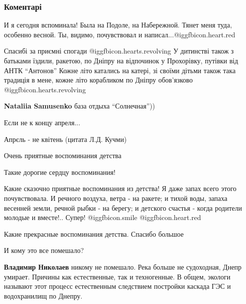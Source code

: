  
 
 
 
 
\subsubsection{Коментарі}
\label{sec:30_03_2021.fb.fb_group.story_kiev_ua.1.dnepr_semja_otdyh.cmt}

\begin{itemize} %
И я сегодня вспоминала! Была на Подоле, на Набережной. Тянет меня туда,
особенно весной. Ты, видимо, почувствовал и написал...@igg{fbicon.heart.red}

Спасибі за приємні спогади @igg{fbicon.hearts.revolving} 
У дитинстві також з батьками їздили, ракетою, по Дніпру на відпочинок у Прохорівку, путівки від АНТК \enquote{Антонов}
Кожне літо катались на катері, зі своїми дітьми також така традиція в мене, кожне літо корабликом по Дніпру обов'язково @igg{fbicon.hearts.revolving} 

\textbf{Nataliia Samusenko} база отдыха \enquote{Солнечная}))

Если не к концу апреля...

Апрєль - не квітень (цитата Л.Д. Кучми)

Очень приятные воспоминания детства

Такие дорогие сердцу воспоминания!


Какие сказочно приятные воспоминания из детства! Я даже запах всего этого
почувствовала. И речного воздуха, ветра - на ракете; и тихой воды, запаха
весенней земли, речной рыбки - на берегу; и детского счастья - когда родители
молодые и вместе!.. Супер!  @igg{fbicon.smile} @igg{fbicon.heart.red}

Какие прекрасные воспоминания детства. Спасибо большое

И кому это все помешало?

\begin{itemize} %
\textbf{Владимир Николаев} никому не помешало. Река больше не судоходная, Днепр умирает. Причины как естественные, так и техногенные. В общем, экологи называют этот процесс естественным следствием постройки каскада ГЭС и водохранилищ по Днепру.


\end{itemize}
\end{itemize}
